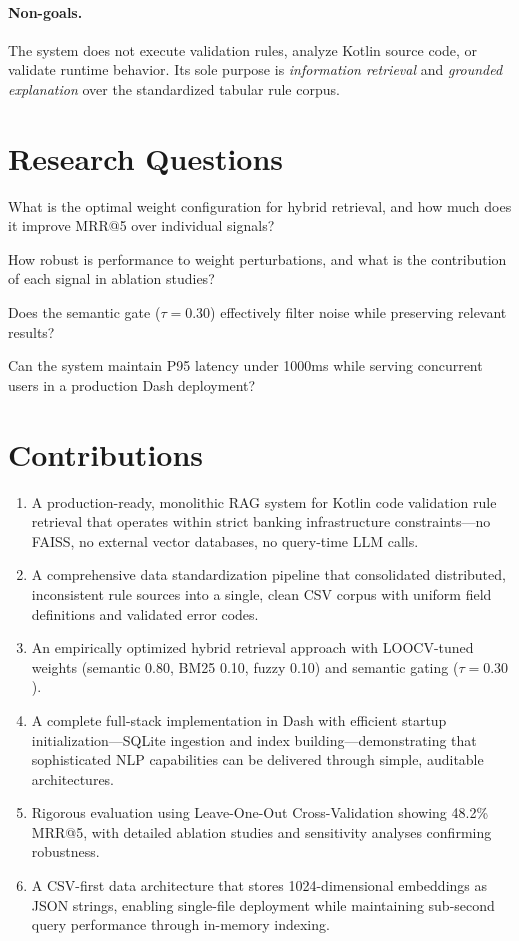 \paragraph{Non-goals.} The system does not execute validation rules, analyze Kotlin source code, or validate runtime behavior. Its sole purpose is \emph{information retrieval} and \emph{grounded explanation} over the standardized tabular rule corpus.

\section{Research Questions}
\begin{description}[leftmargin=!,labelwidth=2.5cm,itemsep=2pt,topsep=2pt]
 \item[RQ1:] What is the optimal weight configuration for hybrid retrieval, and how much does it improve MRR@5 over individual signals?
 \item[RQ2:] How robust is performance to weight perturbations, and what is the contribution of each signal in ablation studies?
 \item[RQ3:] Does the semantic gate ($\tau{=}0.30$) effectively filter noise while preserving relevant results?
 \item[RQ4:] Can the system maintain P95 latency under 1000ms while serving concurrent users in a production Dash deployment?
\end{description}

\section{Contributions}
\begin{enumerate}[leftmargin=*,itemsep=2pt,topsep=2pt]
 \item A production-ready, monolithic RAG system for Kotlin code validation rule retrieval that operates within strict banking infrastructure constraints—no FAISS, no external vector databases, no query-time LLM calls.
 \item A comprehensive data standardization pipeline that consolidated distributed, inconsistent rule sources into a single, clean CSV corpus with uniform field definitions and validated error codes.
 \item An empirically optimized hybrid retrieval approach with LOOCV-tuned weights (semantic 0.80, BM25 0.10, fuzzy 0.10) and semantic gating ($\tau{=}0.30$).
 \item A complete full-stack implementation in Dash with efficient startup initialization—SQLite ingestion and index building—demonstrating that sophisticated NLP capabilities can be delivered through simple, auditable architectures.
 \item Rigorous evaluation using Leave-One-Out Cross-Validation showing 48.2\% MRR@5, with detailed ablation studies and sensitivity analyses confirming robustness.
 \item A CSV-first data architecture that stores 1024-dimensional embeddings as JSON strings, enabling single-file deployment while maintaining sub-second query performance through in-memory indexing.
\end{enumerate}

